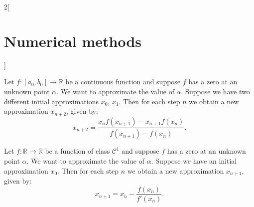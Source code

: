\documentclass[class=article,10pt,crop=false]{standalone}
\begin{document}
\begin{multicols}{2}[\section{Numerical methods}]
\begin{theorem}
\end{theorem}
\begin{theorem}
Let $f:[a_0,b_0]\rightarrow\mathbb{R}$ be a continuous function and suppose $f$ has a zero at an unknown point $\alpha$. We want to approximate the value of $\alpha$. Suppose we have two different initial approximations $x_0$, $x_1$. Then for each step $n$ we obtain a new approximation $x_{n+2}$, given by: $$x_{n+2}=\frac{x_nf(x_{n+1})-x_{n+1}f(x_n)}{f(x_{n+1})-f(x_n)}.$$
\end{theorem}
\begin{theorem}
Let $f:\mathbb{R}\rightarrow\mathbb{R}$ be a function of class $\mathcal{C}^1$ and suppose $f$ has a zero at an unknown point $\alpha$. We want to approximate the value of $\alpha$. Suppose we have an initial approximation $x_0$. Then for each step $n$ we obtain a new approximation $x_{n+1}$, given by: $$x_{n+1}=x_n-\frac{f(x_n)}{f'(x_n)}.$$
\end{theorem}

\end{multicols}
\end{document}
